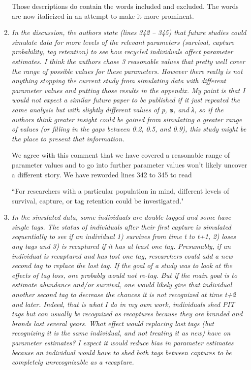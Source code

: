 \documentclass[12pt]{article}
\begin{document}
\begin{enumerate}
Those descriptions do contain the words included and excluded. The words are now italicized in an attempt to make it more prominent. 

\item {\it In the discussion, the authors state (lines 342 – 345) that future studies could simulate data for more levels of the relevant parameters (survival, capture probability, tag retention) to see how recycled individuals affect parameter estimates. I think the authors chose 3 reasonable values that pretty well cover the range of possible values for these parameters. However there really is not anything stopping the current study from simulating data with different parameter values and putting those results in the appendix. My point is that I would not expect a similar future paper to be published if it just repeated the same analysis but with slightly different values of p, φ, and λ, so if the authors think greater insight could be gained from simulating a greater range of values (or filling in the gaps between 0.2, 0.5, and 0.9), this study might be the place to present that information. }

We agree with this comment that we have covered a reasonable range of parameter values and to go into further parameter values won't likely uncover a different story.  We have reworded lines 342 to 345 to read

``For researchers with a particular population in mind, different levels of survival, capture, or tag retention could be investigated."

\item {\it In the simulated data, some individuals are double-tagged and some have single tags. The status of individuals after their first capture is simulated sequentially to see if an individual 1) survives from time t to t+1, 2) loses any tags and 3) is recaptured if it has at least one tag. Presumably, if an individual is recaptured and has lost one tag, researchers could add a new second tag to replace the lost tag. If the goal of a study was to look at the effects of tag loss, one probably would not re-tag. But if the main goal is to estimate abundance and/or survival, one would likely give that individual another second tag to decrease the chances it is not recognized at time t+2 and later. Indeed, that is what I do in my own work, individuals shed PIT tags but can usually be recognized as recaptures because they are branded and brands last several years. What effect would replacing lost tags (but recognizing it is the same individual, and not treating it as new) have on parameter estimates? I expect it would reduce bias in parameter estimates because an individual would have to shed both tags between captures to be completely unrecognizable as a recapture.}


\end{enumerate}
\end{document}

